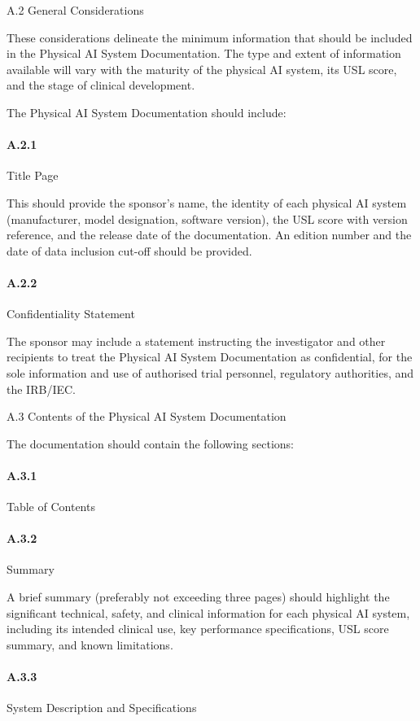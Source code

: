 A.2 General Considerations

These considerations delineate the minimum information that should be included in the Physical AI System Documentation. The type and extent of information available will vary with the maturity of the physical AI system, its USL score, and the stage of clinical development.

The Physical AI System Documentation should include:

\paragraph{A.2.1} Title Page

This should provide the sponsor's name, the identity of each physical AI system (manufacturer, model designation, software version), the USL score with version reference, and the release date of the documentation. An edition number and the date of data inclusion cut-off should be provided.

\paragraph{A.2.2} Confidentiality Statement

The sponsor may include a statement instructing the investigator and other recipients to treat the Physical AI System Documentation as confidential, for the sole information and use of authorised trial personnel, regulatory authorities, and the IRB/IEC.

A.3 Contents of the Physical AI System Documentation

The documentation should contain the following sections:

\paragraph{A.3.1} Table of Contents

\paragraph{A.3.2} Summary

A brief summary (preferably not exceeding three pages) should highlight the significant technical, safety, and clinical information for each physical AI system, including its intended clinical use, key performance specifications, USL score summary, and known limitations.

\paragraph{A.3.3} System Description and Specifications

